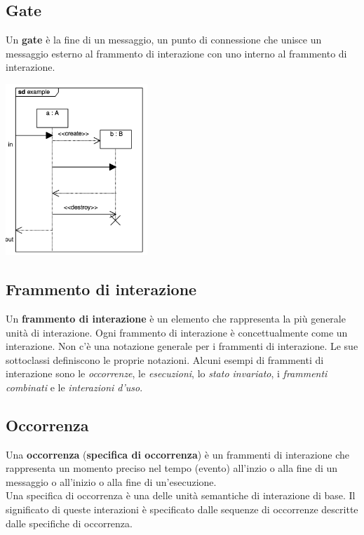 \documentclass{article}
\begin{document}
\subsection*{Gate}
\large

Un \textbf{gate} è la fine di un messaggio, un punto di connessione che unisce un messaggio esterno al frammento di interazione con uno interno al frammento di interazione.
\begin{center}
    \includegraphics[width=0.4\textwidth]{foto 11.png}\\
\end{center}

\subsection*{Frammento di interazione}
\large

Un \textbf{frammento di interazione} è un elemento che rappresenta la più generale unità di interazione. Ogni frammento di interazione è concettualmente come un interazione. Non c'è una notazione generale per i frammenti di interazione. Le sue sottoclassi definiscono le proprie notazioni. Alcuni esempi di frammenti di interazione sono le \textit{occorrenze}, le \textit{esecuzioni}, lo \textit{stato invariato}, i \textit{frammenti combinati} e le \textit{interazioni d'uso}.

\subsection*{Occorrenza}
\large

Una \textbf{occorrenza} (\textbf{specifica di occorrenza}) è un frammenti di interazione che rappresenta un momento preciso nel tempo (evento) all'inzio o alla fine di un messaggio o all'inizio o alla fine di un'esecuzione.\\
Una specifica di occorrenza è una delle unità semantiche di interazione di base. Il significato di queste interazioni è specificato dalle sequenze di occorrenze descritte dalle specifiche di occorrenza.
\end{document}
